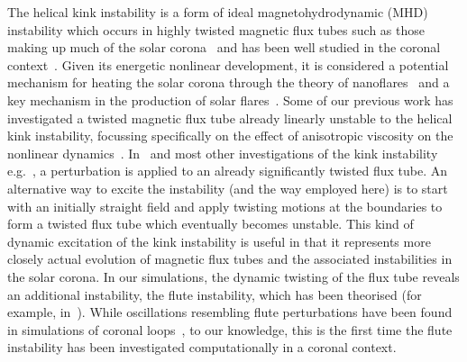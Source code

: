 \documentclass[fleqn,usenatbib]{mnras}
\newcommand{\rev}[1]{{\color{red} #1}}
\begin{document}
The helical kink instability is a form of ideal magnetohydrodynamic (MHD)
instability which occurs in highly twisted magnetic flux tubes such as those
making up much of the solar corona~\citep{realeCoronalLoopsObservations2014}
and has been well studied in the coronal
context~\citep{hoodKinkInstabilitySolar1979,hoodCoronalHeatingMagnetic2009,browningSolarCoronalHeating2003b,barefordShockHeatingNumerical2015,quinnEffectAnisotropicViscosity2020}.
Given its energetic nonlinear development, it is considered a potential
mechanism for heating the solar corona through the theory of
nanoflares~\citep{klimchukSolvingCoronalHeating2006,browningMechanismsSolarCoronal1991}
and a key mechanism in the production of solar
flares~\citep{hoodKinkInstabilitySolar1979}. \rev{Some of our previous work} has
investigated a twisted magnetic flux tube already linearly unstable to the
helical kink instability, focussing specifically on the effect of anisotropic
viscosity on the nonlinear
dynamics~\citep{quinnEffectAnisotropicViscosity2020}.
In~\citet{quinnEffectAnisotropicViscosity2020} and most other investigations of
the kink instability e.g.~\citet{hoodCoronalHeatingMagnetic2009},
a perturbation is applied to an already significantly twisted flux tube. An
alternative way to excite the instability (and the way employed here) is to
start with an initially straight field and apply twisting motions at the
boundaries to form a twisted flux tube which eventually becomes unstable. This
kind of dynamic excitation of the kink instability is useful in that it
represents more closely actual evolution of magnetic flux tubes and the
associated instabilities in the solar corona. In our simulations, the dynamic
twisting of the flux tube reveals an additional instability, the flute
instability, which has been theorised (for example,
in~\citet{priestMagnetohydrodynamicsSun2013}). While oscillations resembling
flute perturbations have been found in simulations of coronal
loops~\citep{terradasEffectMagneticTwist2018}, to our knowledge, this is the
first time the flute instability has been investigated computationally in
a coronal context.
\end{document}
